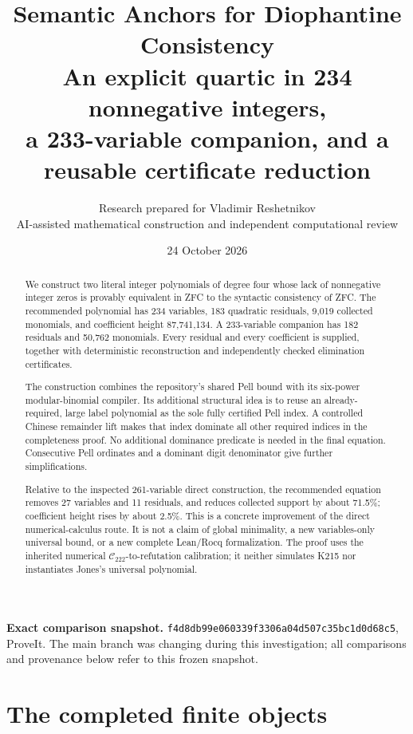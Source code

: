 \documentclass[11pt,a4paper]{article}
\title{\color{ink}\textbf{Semantic Anchors for Diophantine Consistency}\\[5pt]
  \large An explicit quartic in 234 nonnegative integers,\\
  a 233-variable companion, and a reusable certificate reduction}
\author{Research prepared for Vladimir Reshetnikov\\
  \small AI-assisted mathematical construction and independent computational review}
\date{24 October 2026}
\theoremstyle{remark}
\newcommand{\Ccal}{\mathcal C_{222}}
\begin{document}
\maketitle
\thispagestyle{empty}

\begin{abstract}
We construct two literal integer polynomials of degree four whose lack of
nonnegative integer zeros is provably equivalent in ZFC to the syntactic
consistency of ZFC. The recommended polynomial has 234 variables, 183 quadratic
residuals, 9,019 collected monomials, and coefficient height 87,741,134. A
233-variable companion has 182 residuals and 50,762 monomials. Every residual
and every coefficient is supplied, together with deterministic reconstruction
and independently checked elimination certificates.

The construction combines the repository's shared Pell bound with its
six-power modular-binomial compiler. Its additional structural idea is to
reuse an already-required, large label polynomial as the sole fully certified
Pell index. A controlled Chinese remainder lift makes that index dominate all
other required indices in the completeness proof. No additional dominance
predicate is needed in the final equation. Consecutive Pell ordinates and a
dominant digit denominator give further simplifications.

Relative to the inspected 261-variable direct construction, the recommended
equation removes 27 variables and 11 residuals, and reduces collected support
by about 71.5\%; coefficient height rises by about 2.5\%. This is a concrete
improvement of the direct numerical-calculus route. It is not a claim of
global minimality, a new variables-only universal bound, or a new complete
Lean/Rocq formalization. The proof uses the inherited numerical
\(\Ccal\)-to-refutation calibration; it neither simulates K215 nor
instantiates Jones's universal polynomial.
\end{abstract}

\vfill
\textbf{Exact comparison snapshot.}
\texttt{f4d8db99e060339f3306a04d507c35bc1d0d68c5}, ProveIt.
The main branch was changing during this investigation; all comparisons
and provenance below refer to this frozen snapshot.
\newpage
{\setlength{\parskip}{0pt}\tableofcontents}
\newpage

\section{The completed finite objects}
\end{document}
